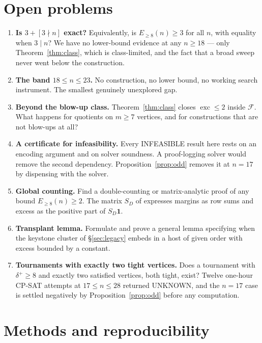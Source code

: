 \documentclass[11pt]{amsart}
\theoremstyle{remark}
\newcommand{\exc}{\operatorname{exc}}
\begin{document}
\section{Open problems}\label{sec:open}

\begin{enumerate}
\item \textbf{Is $3 + [3 \nmid n]$ exact?} Equivalently, is
  $E_{\ge 8}(n) \ge 3$ for all $n$, with equality when $3 \mid n$? We
  have no lower-bound evidence at any $n \ge 18$ --- only
  Theorem~\ref{thm:class}, which is class-limited, and the fact that a broad
  sweep never went below the construction.
\item \textbf{The band $18 \le n \le 23$.} No construction, no lower bound, no
  working search instrument. The smallest genuinely unexplored gap.
\item \textbf{Beyond the blow-up class.} Theorem~\ref{thm:class} closes
  $\exc \le 2$ inside $\mathcal{F}$. What happens for quotients on $m \ge 7$
  vertices, and for constructions that are not blow-ups at all?
\item \textbf{A certificate for infeasibility.} Every INFEASIBLE result here
  rests on an encoding argument and on solver soundness. A proof-logging
  solver would remove the second dependency. Proposition~\ref{prop:odd}
  removes it at $n = 17$ by dispensing with the solver.
\item \textbf{Global counting.} Find a double-counting or matrix-analytic
  proof of any bound $E_{\ge 8}(n) \ge 2$. The matrix $S_D$ of
  \cite{GuoKangZwaneveld2026} expresses margins as row sums and excess as the
  positive part of $S_D \mathbf{1}$.
\item \label{prob:transplant}\textbf{Transplant lemma.} Formulate and prove a
  general lemma specifying when the keystone cluster of \S\ref{sec:legacy}
  embeds in a host of given order with excess bounded by a constant.
\item \textbf{Tournaments with exactly two tight vertices.} Does a tournament
  with $\delta^+ \ge 8$ and exactly two satisfied vertices, both tight, exist?
  Twelve one-hour CP-SAT attempts at $17 \le n \le 28$ returned UNKNOWN, and
  the $n = 17$ case is settled negatively by Proposition~\ref{prop:odd}
  before any computation.
\end{enumerate}

\section{Methods and reproducibility}
\end{document}
